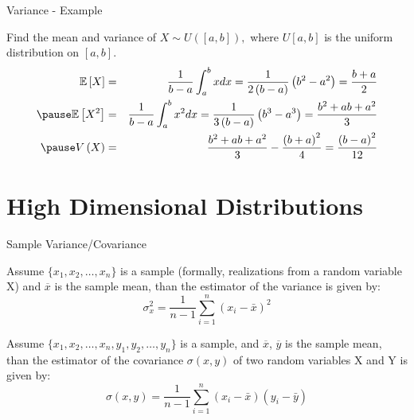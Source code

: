 \documentclass[11pt, usenames, dvipsnames]{beamer}
\begin{document}
\begingroup
\small%

\begin{frame}{Variance - Example}
\begin{example}
Find the mean and variance of $X\sim U\left(\left[a,b\right]\right),$ where $U[a,b]$ is the uniform distribution on $[a,b].$
\begin{eqnarray*}
\bE\left[X\right] & = & \frac{1}{b-a}\int_{a}^{b}xdx=\frac{1}{2\left(b-a\right)}\left(b^{2}-a^{2}\right)=\frac{b+a}{2}\\
\pause
\bE\left[X^{2}\right] & = & \frac{1}{b-a}\int_{a}^{b}x^{2}dx=\frac{1}{3\left(b-a\right)}\left(b^{3}-a^{3}\right)=\frac{b^{2}+ab+a^{2}}{3}\\
\pause
V\left(X\right) & = & \frac{b^{2}+ab+a^{2}}{3}-\frac{\left(b+a\right)^{2}}{4}=\frac{\left(b-a\right)^{2}}{12}
\end{eqnarray*}
\end{example}

\end{frame}
\endgroup
\section{High Dimensional Distributions}

\begingroup
\footnotesize%
\begin{frame}{Sample Variance/Covariance}
\begin{definition}
    Assume $\{x_{1},x_{2},\ldots ,x_{n}\}$ is a sample (formally, realizations from a random variable X) and ${\overline {x}}$ is the sample mean, than the estimator of the variance is given by:
$$\sigma^2_x = \frac{1}{n-1} \sum^{n}_{i=1}(x_i- \bar{x})^2$$
\end{definition}
\pause

\begin{definition}
    Assume $\{x_{1},x_{2},\ldots ,x_{n}, y_{1},y_{2},\ldots ,y_{n}\}$ is a sample, and ${\overline {x}}$, ${\overline {y}}$ is the sample mean, than the estimator of the covariance $\sigma\left(x,y\right)$ of two random variables X and Y is given by:
$$\sigma(x, y) = \frac{1}{n-1} \sum^{n}_{i=1}{(x_i-\bar{x})(y_i-\bar{y})}$$

\end{definition}
\end{frame}
\endgroup
\end{document}
